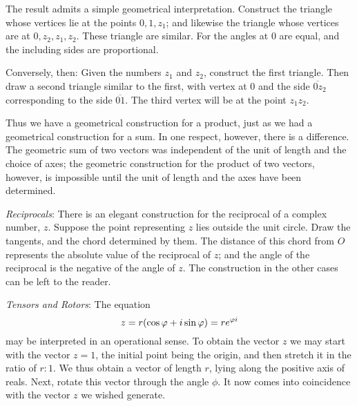 The result admits a simple geometrical interpretation. Construct the triangle whose vertices lie at the points $0, 1, z_1$; and likewise the triangle whose vertices are at $0, z_2, z_1, z_2$. These triangle are similar. For the angles at $0$ are equal, and the including sides are proportional. 

Conversely, then: Given the numbers $z_1$ and $z_2$, construct the first triangle. Then draw a second triangle similar to the first, with vertex at $0$ and the side $\overline{0z}_2$ corresponding to the side $\overline{01}$. The third vertex will be at the point $z_1z_2$. 

\begin{wrapfigure}{R}{0.4\textwidth}
\end{wrapfigure} 
Thus we have a geometrical construction for a product, just as we had a geometrical construction for a sum. In one respect, however, there is a difference. The geometric sum of two vectors was independent of the unit of length and the choice of axes; the geometric construction for the product of two vectors, however, is impossible until the unit of length and the axes have been determined. 

\emph{Reciprocals}: There is an elegant construction for the reciprocal of a complex number, $z$. Suppose the point representing $z$ lies outside the unit circle. Draw the tangents, and the chord determined by them. The distance of this chord from $O$ represents the absolute value of the reciprocal of $z$; and the angle of the reciprocal is the negative of the angle of $z$. The construction in the other cases can be left to the reader.

\emph{Tensors and Rotors}: The equation
\[
	z=r\pbr*{\cos \phi +i\sin \phi } =r e^{\phi i}
\] may be interpreted in an operational sense. To obtain the vector $z$ we may start with the vector $z=1$, the initial point being the origin, and then stretch it in the ratio of $r :1$. We thus obtain a vector of length $r$, lying along the positive axis of reals. Next, rotate this vector through the angle $\phi $. It now comes into coincidence with the vector $z$ we wished generate.

